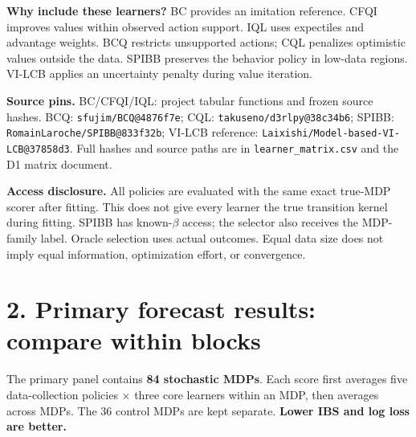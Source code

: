 \documentclass[10pt,a4paper]{article}
\begin{document}
\textbf{Why include these learners?} BC provides an imitation reference. CFQI improves values within observed action support. IQL uses expectiles and advantage weights. BCQ restricts unsupported actions; CQL penalizes optimistic values outside the data. SPIBB preserves the behavior policy in low-data regions. VI-LCB applies an uncertainty penalty during value iteration.

\textbf{Source pins.} BC/CFQI/IQL: project tabular functions and frozen source hashes. BCQ: \texttt{sfujim/BCQ@4876f7e}; CQL: \texttt{takuseno/d3rlpy@38c34b6}; SPIBB: \texttt{RomainLaroche/SPIBB@833f32b}; VI-LCB reference: \texttt{Laixishi/Model-based-VI-LCB@37858d3}. Full hashes and source paths are in \texttt{learner\_matrix.csv} and the D1 matrix document.

\textbf{Access disclosure.} All policies are evaluated with the same exact true-MDP scorer after fitting. This does not give every learner the true transition kernel during fitting. SPIBB has known-$\beta$ access; the selector also receives the MDP-family label. Oracle selection uses actual outcomes. Equal data size does not imply equal information, optimization effort, or convergence.

\newpage
\section*{2. Primary forecast results: compare within blocks}
The primary panel contains \textbf{84 stochastic MDPs}. Each score first averages five data-collection policies $\times$ three core learners within an MDP, then averages across MDPs. The 36 control MDPs are kept separate. \textbf{Lower IBS and log loss are better.}
\end{document}
